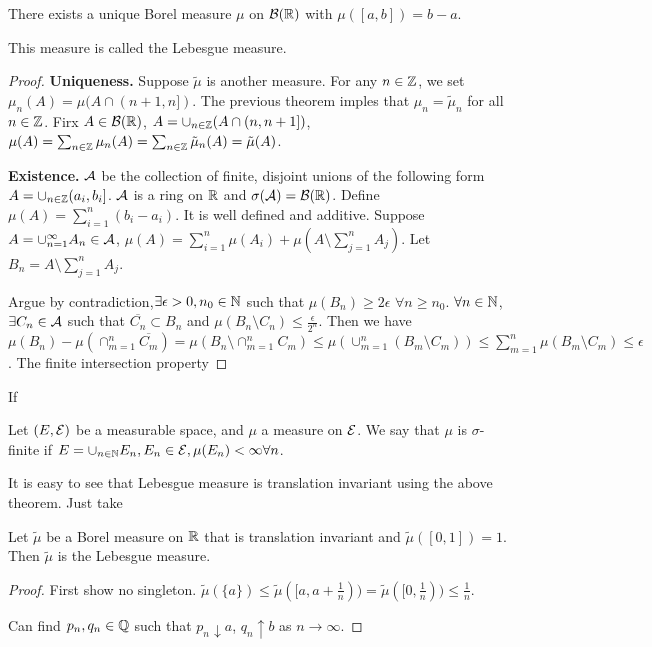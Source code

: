 \begin{theorem}
    There exists a unique Borel measure $\mu$ on $\mathcal{B}(\mathbb{R})$ with $\mu([a,b])=b-a$.
\end{theorem}
\begin{remark}
    This measure is called the Lebesgue measure.
\end{remark}
\begin{proof}
    \textbf{Uniqueness.} Suppose $\tilde{\mu}$ is another measure. For any $n\in\mathbb{Z}$, we set $\mu_n(A)=\mu(A\cap (n+1,n])$.
    The previous theorem imples that $\mu_n=\tilde{\mu}_n$ for all $n\in\mathbb{Z}$. Firx $A\in\mathcal{B}(\mathbb{R})$, $A=\cup_{n\in\mathbb{Z}}(A\cap (n,n+1])$,
    $\mu(A)=\sum_{n\in\mathbb{Z}}\mu_n(A)=\sum_{n\in\mathbb{Z}}\tilde{\mu}_n(A)=\tilde{\mu}(A)$.

    \textbf{Existence.} $\mathcal{A}$ be the collection of finite, disjoint unions of the following form $A=\cup_{n\in\mathbb{Z}}(a_i,b_i]$.
    $\mathcal{A}$ is a ring on $\mathbb{R}$ and $\sigma(\mathcal{A})=\mathcal{B}(\mathbb{R})$. Define $\mu(A)=\sum_{i=1}^{n}(b_i-a_i)$. It is well defined and additive.
    Suppose $A=\cup_{n=1}^\infty A_n\in\mathcal{A}$, $\mu(A)=\sum_{i=1}^{n}\mu(A_i)+\mu(A\setminus\sum_{j=1}^{n}A_j)$. Let $B_n=A\setminus\sum_{j=1}^{n}A_j$.

    Argue by contradiction,$\exists\epsilon>0,n_0\in\mathbb{N}$ such that $\mu(B_n)\geq 2\epsilon$ $\forall n\geq n_0$.
    $\forall n\in\mathbb{N}$, $\exists C_n\in\mathcal{A}$ such that $\overline{C_n}\subset B_n$ and $\mu(B_n\setminus C_n)\leq \frac{\epsilon}{2^n}$.
    Then we have $\mu(B_n)-\mu (\cap_{m=1}^n \overline{C_m})=\mu(B_n\setminus \cap_{m=1}^n C_m)\leq \mu(\cup_{m=1}^n (B_m\setminus C_m))\leq \sum_{m=1}^{n}\mu(B_m\setminus C_m)\leq \epsilon$.
    The finite intersection property
\end{proof}
\begin{lemma}
    If 
\end{lemma}

\begin{definition}
    Let $(E,\mathcal{E})$ be a measurable space, and $\mu$ a measure on $\mathcal{E}$.
    We say that $\mu$ is $\sigma$-finite if $E=\cup_{n\in\mathbb{N}}E_n,E_n\in\mathcal{E},\mu(E_n)<\infty\forall n$.
\end{definition}

It is easy to see that Lebesgue measure is translation invariant using the above theorem.
Just take

\begin{theorem}
    Let $\tilde{\mu}$ be a Borel measure on $\mathbb{R}$ that is translation invariant and $\tilde{\mu}([0,1])=1$.
    Then $\tilde{\mu}$ is the Lebesgue measure.
\end{theorem}
\begin{proof}
    First show no singleton.
    $\tilde{\mu}(\{a\})\leq \tilde{\mu}([a,a+\frac{1}{n}))=\tilde{\mu}([0,\frac{1}{n}))\leq\frac{1}{n}$.

    Can find $p_n,q_n\in\mathbb{Q}$ such that $p_n\downarrow a$, $q_n\uparrow b$ as $n\to\infty$.
\end{proof}

